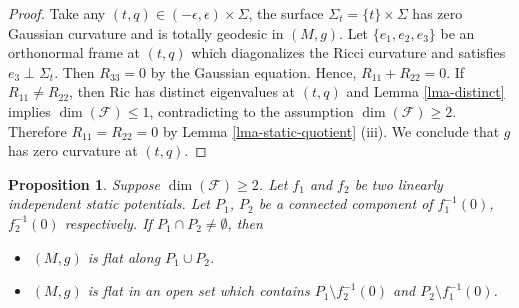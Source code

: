 \documentclass[12pt]{amsart}
\newtheorem{prop}{Proposition}[section]
\theoremstyle{remark}
\numberwithin{equation}{section}
\newcommand{\Ric}{\mbox{Ric}}
\def\K{\mathcal{F}}
\begin{document}
\begin{proof}
Take any $ (t, q) \in  (- \epsilon, \epsilon ) \times \Sigma $, the surface $ \Sigma_t = \{ t \} \times \Sigma$ has zero Gaussian curvature and
is totally geodesic in $(M, g)$.
 Let $ \{ e_1, e_2, e_3 \}$ be an orthonormal frame at $(t, q)$
which diagonalizes the Ricci curvature and satisfies $ e_3 \perp \Sigma_t$. Then $ R_{33} = 0 $ by the Gaussian equation.
Hence, $ R_{11} + R_{22} = 0 $. If $ R_{11} \neq R_{22}$, then $\Ric$ has distinct eigenvalues at $(t,q)$ and Lemma \ref{lma-distinct} implies $ \dim (\K) \le 1 $, contradicting to the assumption $ \dim (\K) \ge 2 $.
Therefore $ R_{11} = R_{22} = 0 $ by Lemma \ref{lma-static-quotient} (iii).
We conclude that $ g$ has zero curvature at $(t, q)$.
\end{proof}

\begin{prop}\label{prop-two-zeros}
Suppose  $ \dim (\K) \ge 2$. Let
 $f_1$ and $ f_2$ be two linearly independent static potentials.
Let $ P_1$, $ P_2$ be a connected component of
$f_1^{-1}(0)$, $  f_2^{-1}(0) $ respectively. If $P_1 \cap P_2 \neq \emptyset$, then
\begin{itemize}
\item[(i)]  $(M, g)$ is flat along $P_1 \cup P_2$.
\item[(ii)] $(M, g)$ is flat in an open set which contains $P_1 \setminus f^{-1}_2 (0) $ and $ P_2 \setminus f_1^{-1} (0)$.
\end{itemize}

\end{prop}
\end{document}
